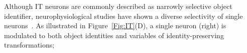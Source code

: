 \documentclass[journal]{journal}
\begin{document}
%
%
Although IT neurons are commonly described as narrowly selective object identifier, neurophysiological studies have shown a diverse selectivity of single neurons~\cite{desimone1984stimulus}.
As illustrated in Figure~\ref{Fig:IT}(D), a single neuron (right) is modulated to both object identities and variables of identity-preserving transformations;
\end{document}
